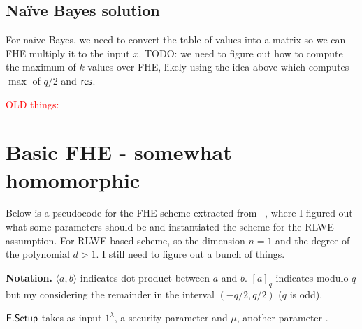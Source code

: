 \documentclass[11pt]{article}
\begin{document}





\subsection{Na\"ive Bayes solution}

For na\"ive Bayes, we need to convert the table of values into a matrix so we can FHE multiply it to the input $x$. TODO: we need to figure out how to compute the maximum of $k$ values over FHE, likely using the idea above which computes $\max$ of $q/2$ and $\mathsf{res}$.



\newpage

\textcolor{red}{OLD things:}

\section{Basic FHE - somewhat homomorphic}



Below is a pseudocode for the FHE scheme extracted from ~\cite{BGV12}, where I figured out what some parameters should be and instantiated the scheme for the RLWE assumption.
For RLWE-based scheme, so the dimension $n=1$ and the degree of the polynomial $d>1$. I still need to figure out a bunch of things.


\textbf{Notation.} $\langle a, b \rangle$ indicates dot product between $a$ and $b$.  $[a]_q$ indicates modulo $q$ but my considering the remainder in the interval $(-q/2, q/2)$ ($q$ is odd).


$\mathsf{E.Setup}$ takes as input $1^\lambda$, a security parameter and $\mu$, another parameter .

\end{document}
